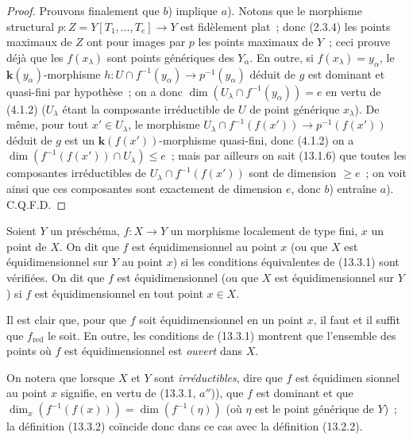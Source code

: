 \begin{proof}
Prouvons finalement que $b$) implique $a$). Notons que le morphisme structural
$p:Z=Y[T_1,\ldots,T_e]\to Y$ est fidèlement plat~; donc (2.3.4) les points
maximaux de $Z$ ont pour images par $p$ les points maximaux de $Y$~; ceci
prouve déjà que les $f(x_\lambda)$ sont points génériques des $Y_\alpha$. En
outre, si $f(x_\lambda)=y_\alpha$, le $\boldsymbol{k}(y_\alpha)$-morphisme
$h:U\cap f^{-1}(y_\alpha)\to p^{-1}(y_\alpha)$ déduit de $g$ est dominant et
quasi-fini par hypothèse~; on a donc
$\dim(U_\lambda\cap f^{-1}(y_\alpha))=e$ en vertu de (4.1.2)
($U_\lambda$ étant la composante irréductible de $U$ de point générique
$x_\lambda$). De même, pour tout $x'\in U_\lambda$, le morphisme
$U_\lambda\cap f^{-1}(f(x'))\to p^{-1}(f(x'))$ déduit de $g$ est un
$\boldsymbol{k}(f(x'))$-morphisme quasi-fini, donc (4.1.2) on a
$\dim(f^{-1}(f(x'))\cap U_\lambda)\leq e$~; mais par ailleurs on sait (13.1.6)
que toutes les composantes irréductibles de
$U_\lambda\cap f^{-1}(f(x'))$ sont de dimension $\geq e$~; on voit ainsi que
ces composantes sont exactement de dimension $e$, donc $b$) entraîne $a$).
C.Q.F.D.
\end{proof}

\begin{definition}[13.3.2]
\label{IV.13.3.2-fr}
Soient $Y$ un préschéma, $f:X\to Y$ un morphisme localement de type fini, $x$
un point de $X$. On dit que $f$ est \textup{équidimensionnel au point} $x$ (ou que $X$
est \textup{équidimensionnel sur $Y$ au point} $x$) si les conditions équivalentes de
\textup{(13.3.1)} sont vérifiées. On dit que $f$ est \textup{équidimensionnel} (ou que $X$ est
\textup{équidimensionnel sur $Y$)} si $f$ est équidimensionnel en tout point $x\in X$.
\end{definition}

Il est clair que, pour que $f$ soit équidimensionnel en un point $x$, il faut
et il suffit que $f_{\mathrm{red}}$ le soit. En outre, les conditions de
(13.3.1) montrent que l'ensemble des points où $f$ est équidimensionnel est
\emph{ouvert} dans $X$.

On notera que lorsque $X$ et $Y$ sont \emph{irréductibles}, dire que $f$ est
équidimen%
sionnel au point $x$ signifie, en vertu de (13.3.1, $a''$)), que $f$ est
dominant et que
$\dim_x(f^{-1}(f(x)))=\dim(f^{-1}(\eta))$ (où $\eta$ est le point générique de
$Y$)~; la définition (13.3.2) coïncide donc dans ce cas avec la définition
(13.2.2).


